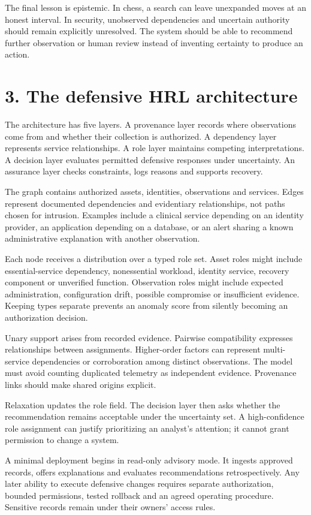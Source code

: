 \documentclass[11pt]{article}
\begin{document}
The final lesson is epistemic. In chess, a search can leave unexpanded moves at an honest interval. In security, unobserved dependencies and uncertain authority should remain explicitly unresolved. The system should be able to recommend further observation or human review instead of inventing certainty to produce an action.

\clearpage
\section*{3. The defensive HRL architecture}
The architecture has five layers. A provenance layer records where observations come from and whether their collection is authorized. A dependency layer represents service relationships. A role layer maintains competing interpretations. A decision layer evaluates permitted defensive responses under uncertainty. An assurance layer checks constraints, logs reasons and supports recovery.

The graph contains authorized assets, identities, observations and services. Edges represent documented dependencies and evidentiary relationships, not paths chosen for intrusion. Examples include a clinical service depending on an identity provider, an application depending on a database, or an alert sharing a known administrative explanation with another observation.

Each node receives a distribution over a typed role set. Asset roles might include essential-service dependency, nonessential workload, identity service, recovery component or unverified function. Observation roles might include expected administration, configuration drift, possible compromise or insufficient evidence. Keeping types separate prevents an anomaly score from silently becoming an authorization decision.

Unary support arises from recorded evidence. Pairwise compatibility expresses relationships between assignments. Higher-order factors can represent multi-service dependencies or corroboration among distinct observations. The model must avoid counting duplicated telemetry as independent evidence. Provenance links should make shared origins explicit.

Relaxation updates the role field. The decision layer then asks whether the recommendation remains acceptable under the uncertainty set. A high-confidence role assignment can justify prioritizing an analyst's attention; it cannot grant permission to change a system.

A minimal deployment begins in read-only advisory mode. It ingests approved records, offers explanations and evaluates recommendations retrospectively. Any later ability to execute defensive changes requires separate authorization, bounded permissions, tested rollback and an agreed operating procedure. Sensitive records remain under their owners' access rules.
\end{document}
